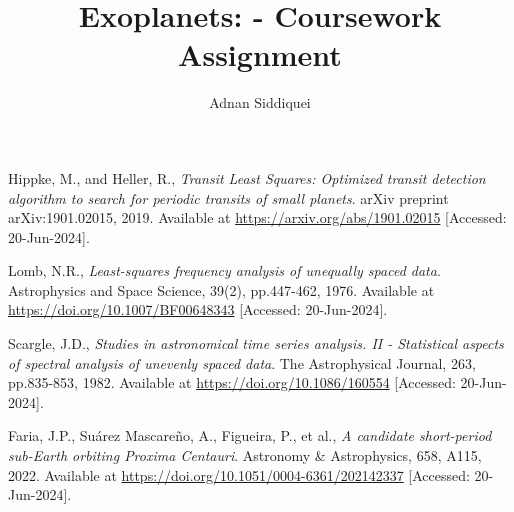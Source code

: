 \documentclass[a4paper,11pt]{article}
\title{\boldmath Exoplanets: - Coursework Assignment}
\author{Adnan Siddiquei}
\affiliation{University of Cambridge}
\newcommand{\inlinecode}[1]{\texttt{\seqsplit{#1}}}
\begin{document}
\maketitle
\flushbottom



\clearpage


\clearpage
\appendix


\begin{thebibliography}{99}

    Hippke, M., and Heller, R.,
    \textit{Transit Least Squares: Optimized transit detection algorithm to search for periodic transits of small planets}.
    arXiv preprint arXiv:1901.02015, 2019.
    Available at \url{https://arxiv.org/abs/1901.02015} [Accessed: 20-Jun-2024].

    Lomb, N.R.,
    \textit{Least-squares frequency analysis of unequally spaced data}.
    Astrophysics and Space Science, 39(2), pp.447-462, 1976.
    Available at \url{https://doi.org/10.1007/BF00648343} [Accessed: 20-Jun-2024].

    Scargle, J.D.,
    \textit{Studies in astronomical time series analysis. II - Statistical aspects of spectral analysis of unevenly spaced data}.
    The Astrophysical Journal, 263, pp.835-853, 1982.
    Available at \url{https://doi.org/10.1086/160554} [Accessed: 20-Jun-2024].

    Faria, J.P., Suárez Mascareño, A., Figueira, P., et al.,
    \textit{A candidate short-period sub-Earth orbiting Proxima Centauri}.
    Astronomy \& Astrophysics, 658, A115, 2022.
    Available at \url{https://doi.org/10.1051/0004-6361/202142337} [Accessed: 20-Jun-2024].


\end{thebibliography}
\end{document}
